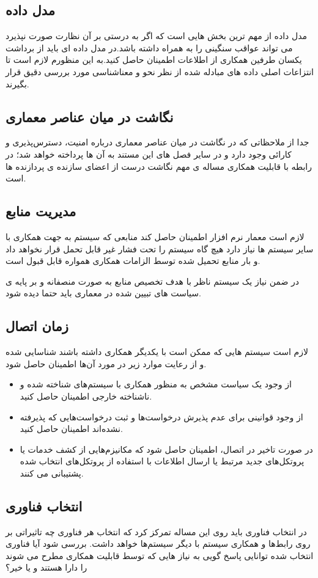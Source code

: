 \subsection{مدل داده}
مدل داده  از مهم ترین بخش هایی است که اگر به درستی بر آن نظارت صورت نپذیرد می تواند عواقب سنگینی را به همراه داشته باشد.در مدل داده ای باید از برداشت یکسان طرفین همکاری از اطلاعات اطمینان حاصل کنید.به این منظورم لازم است تا انتزاعات اصلی داده های مبادله شده از نظر نحو و معناشناسی مورد بررسی دقیق قرار بگیرند.
\subsection{نگاشت در میان عناصر معماری}
جدا از ملاحظاتی که در نگاشت در میان عناصر معماری درباره امنیت،‌ دسترس‌پذیری و کارائی وجود دارد و در سایر فصل های این مستند به آن ها پرداخته خواهد شد؛ در رابطه با قابلیت همکاری مساله ی مهم نگاشت درست از اعضای سازنده ی پردازنده ها است.
\subsection{مدیریت منابع}
لازم است معمار نرم افزار اطمینان حاصل کند منابعی که سیستم به جهت همکاری با سایر سیستم ها نیاز دارد هیچ گاه سیستم را تحت فشار غیر قابل تحمل قرار نخواهد داد و بار منابع تحمیل شده توسط الزامات همکاری همواره قابل قبول است.

در ضمن نیاز یک سیستم ناظر با هدف تخصیص منابع به صورت منصفانه و بر پایه ی سیاست های تبیین شده در معماری باید حتما دیده شود.
\subsection{زمان اتصال}
لازم است سیستم هایی که ممکن است با یکدیگر همکاری داشته باشند شناسایی شده و از رعایت موارد زیر در مورد آن‌ها اطمینان حاصل شود.
\begin{itemize}
\item
از وجود یک سیاست مشخص به منظور همکاری با سیستم‌های شناخته شده و ناشناخته خارجی اطمینان حاصل کنید.
\item
از وجود قوانینی برای عدم پذیرش درخواست‌ها و ثبت درخواست‌هایی که پذیرفته نشده‌اند اطمینان حاصل کنید.
\item
در صورت تاخیر در اتصال، اطمینان حاصل شود که مکانیزم‌هایی از کشف خدمات یا پروتکل‌های جدید مرتبط یا ارسال اطلاعات با استفاده از پروتکل‌های انتخاب شده پشتیبانی می کنند.
\end{itemize}
\subsection{انتخاب فناوری}
در انتخاب فناوری باید روی این مساله تمرکز کرد که انتخاب هر فناوری چه تاثیراتی بر روی رابط‌ها و همکاری سیستم با دیگر سیستم‌ها خواهد داشت. بررسی شود آیا فناوری انتخاب شده توانایی پاسخ گویی به نیاز هایی که توسط قابلیت همکاری مطرح می شوند را دارا هستند و یا خیر؟


